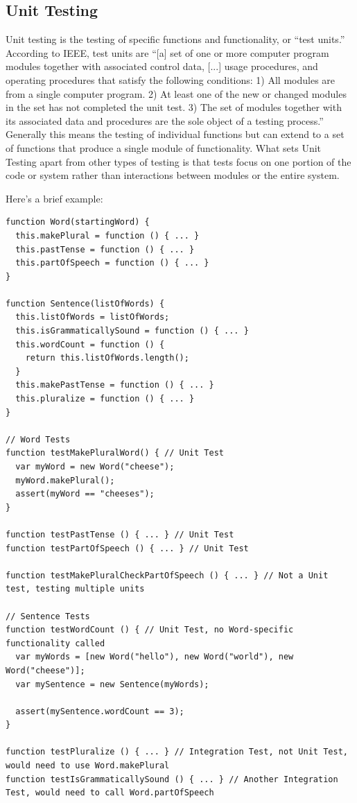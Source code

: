 \documentclass[12pt]{ucthesis}
\begin{document}
\subsection{Unit Testing}
Unit testing is the testing of specific functions and functionality, or ``test units.'' According to IEEE, test units are ``[a] set of one or more computer program modules together with associated control data, [...] usage procedures, and operating procedures that satisfy the following conditions: 1) All modules are from a single computer program. 2) At least one of the new or changed modules in the set has not completed the unit test. 3) The set of modules together with its associated data and procedures are the sole object of a testing process.''\cite{UnitTestDefinition} Generally this means the testing of individual functions but can extend to a set of functions that produce a single module of functionality. What sets Unit Testing apart from other types of testing is that tests focus on one portion of the code or system rather than interactions between modules or the entire system.

Here's a brief example:
\begin{lstlisting}
function Word(startingWord) {
  this.makePlural = function () { ... }
  this.pastTense = function () { ... }
  this.partOfSpeech = function () { ... }
}

function Sentence(listOfWords) {
  this.listOfWords = listOfWords;
  this.isGrammaticallySound = function () { ... }
  this.wordCount = function () {
    return this.listOfWords.length();
  }
  this.makePastTense = function () { ... }
  this.pluralize = function () { ... }
}

// Word Tests
function testMakePluralWord() { // Unit Test
  var myWord = new Word("cheese");
  myWord.makePlural();
  assert(myWord == "cheeses");
}

function testPastTense () { ... } // Unit Test
function testPartOfSpeech () { ... } // Unit Test

function testMakePluralCheckPartOfSpeech () { ... } // Not a Unit test, testing multiple units

// Sentence Tests
function testWordCount () { // Unit Test, no Word-specific functionality called
  var myWords = [new Word("hello"), new Word("world"), new Word("cheese")];
  var mySentence = new Sentence(myWords);

  assert(mySentence.wordCount == 3);
}

function testPluralize () { ... } // Integration Test, not Unit Test, would need to use Word.makePlural
function testIsGrammaticallySound () { ... } // Another Integration Test, would need to call Word.partOfSpeech

\end{lstlisting}
\end{document}
